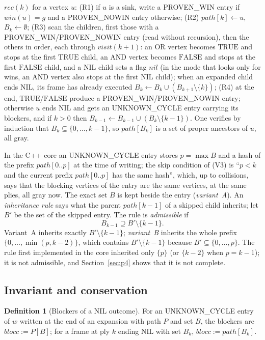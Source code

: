 \documentclass{article}
\theoremstyle{plain}
\theoremstyle{definition}
\newtheorem{definition}[theorem]{Definition}
\theoremstyle{remark}
\newcommand{\win}{\mathit{win}}
\newcommand{\TRUE}{\ensuremath{\mathrm{TRUE}}}
\newcommand{\FALSE}{\ensuremath{\mathrm{FALSE}}}
\newcommand{\NIL}{\ensuremath{\mathrm{NIL}}}
\newcommand{\PW}{\textsf{PROVEN\_WIN}}
\newcommand{\PN}{\textsf{PROVEN\_NOWIN}}
\newcommand{\UC}{\textsf{UNKNOWN\_CYCLE}}
\begin{document}
$\mathit{rec}(k)$ for a vertex $u$: (R1) if $u$ is a sink, write a \PW{} entry if $\win(u) = g$ and a \PN{} entry otherwise; (R2) $\mathit{path}[k] \gets u$, $B_k \gets \emptyset$; (R3) scan the children, first those with a \PW{}/\PN{} entry (read without recursion), then the others in order, each through $\mathit{visit}(k+1)$: an OR vertex becomes \TRUE{} and stops at the first \TRUE{} child, an AND vertex becomes \FALSE{} and stops at the first \FALSE{} child, and a \NIL{} child sets a flag $\mathit{nil}$ (in the mode that looks only for wins, an AND vertex also stops at the first \NIL{} child); when an expanded child ends \NIL{}, its frame has already executed $B_k \gets B_k \cup (B_{k+1} \setminus \{k\})$; (R4) at the end, \TRUE{}/\FALSE{} produce a \PW{}/\PN{} entry; otherwise $u$ ends \NIL{} and gets an \UC{} entry carrying its blockers, and if $k > 0$ then $B_{k-1} \gets B_{k-1} \cup (B_k \setminus \{k-1\})$. One verifies by induction that $B_k \subseteq \{0, \dots, k-1\}$, so $\mathit{path}[B_k]$ is a set of proper ancestors of $u$, all gray.

In the C++ core an \UC{} entry stores $p = \max B$ and a hash of the prefix $\mathit{path}[0..p]$ at the time of writing; the skip condition of (V3) is ``$p < k$ and the current prefix $\mathit{path}[0..p]$ has the same hash'', which, up to collisions, says that the blocking vertices of the entry are the same vertices, at the same plies, all gray now. The exact set $B$ is kept beside the entry (\emph{variant~A}). An \emph{inheritance rule} says what the parent $\mathit{path}[k-1]$ of a skipped child inherits; let $B'$ be the set of the skipped entry. The rule is \emph{admissible} if
\begin{equation}\label{eq:H}
B_{k-1} \supseteq B' \setminus \{k-1\}. \tag{H}
\end{equation}
Variant~A inherits exactly $B' \setminus \{k-1\}$; \emph{variant~B} inherits the whole prefix $\{0, \dots, \min(p, k-2)\}$, which contains $B' \setminus \{k-1\}$ because $B' \subseteq \{0, \dots, p\}$. The rule first implemented in the core inherited only $\{p\}$ (or $\{k-2\}$ when $p = k-1$); it is not admissible, and Section~\ref{sec:p4} shows that it is not complete.

\subsection{Invariant and conservation}

\begin{definition}[Blockers of a \NIL{} outcome]
For an \UC{} entry of $w$ written at the end of an expansion with path $P$ and set $B$, the blockers are $\mathit{blocc} := P[B]$; for a frame at ply $k$ ending \NIL{} with set $B_k$, $\mathit{blocc} := \mathit{path}[B_k]$.
\end{definition}
\end{document}
